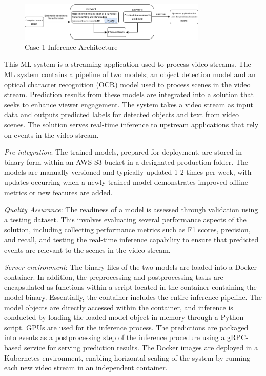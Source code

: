 
\begin{figure}[t]
\centering
\includegraphics[width=0.8\textwidth]{images/case1_deployment_process_v2.png}
\caption{Case 1 Inference Architecture}
\label{fig: case1_deployment_process}
\end{figure}

This ML system is a streaming application used to process video streams. The ML system contains a pipeline of two models; an object detection model and an optical character recognition (OCR) model used to process scenes in the video stream. Prediction results from these models are integrated into a solution that seeks to enhance viewer engagement. The system takes a video stream as input data and outputs predicted labels for detected objects and text from video scenes. The solution serves real-time inference to upstream applications that rely on events in the video stream.

\textit{Pre-integration}: The trained models, prepared for deployment, are stored in binary form within an AWS S3 bucket in a designated production folder. The models are manually versioned and typically updated 1-2 times per week, with updates occurring when a newly trained model demonstrates improved offline metrics or new features are added.

\textit{Quality Assurance}: The readiness of a model is assessed through validation using a testing dataset. This involves evaluating several performance aspects of the solution, including collecting performance metrics such as F1 scores, precision, and recall, and testing the real-time inference capability to ensure that predicted events are relevant to the scenes in the video stream.

\textit{Server environment}: The binary files of the two models are loaded into a Docker container. In addition, the preprocessing and postprocessing tasks are encapsulated as functions within a script located in the container containing the model binary. Essentially, the container includes the entire inference pipeline. The model objects are directly accessed within the container, and inference is conducted by loading the loaded model object in memory through a Python script. GPUs are used for the inference process. The predictions are packaged into events as a postprocessing step of the inference procedure using a gRPC-based service for serving prediction results. The Docker images are deployed in a Kubernetes environment, enabling horizontal scaling of the system by running each new video stream in an independent container. %

